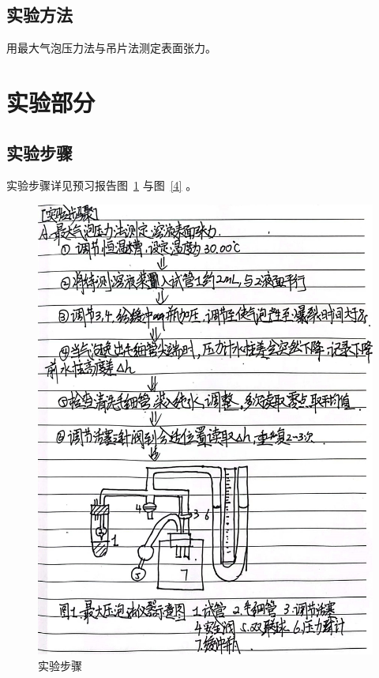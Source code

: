 \documentclass[cn,hazy,pku,12pt,normal,math=newtx,cite=super]{elegantnote}
\begin{document}
\subsection{实验方法}

用最大气泡压力法与吊片法测定表面张力。

\section{实验部分}

\subsection{实验步骤}

实验步骤详见预习报告图~\ref{b} 与图~\ref{4} 。
\begin{figure}[htbp]
    \centering
    \includegraphics[width = .70\textwidth]{image/yxbg_2.jpg}
    \caption{实验步骤}\label{b}
\end{figure}
\end{document}
